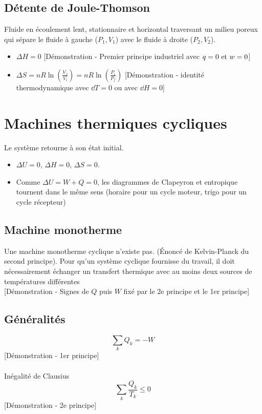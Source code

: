 \documentclass[openany]{book}
\begin{document}
\subsection{Détente de Joule-Thomson}
Fluide en écoulement lent, stationnaire et horizontal traversant un milieu poreux qui sépare le fluide à gauche ($P_1, V_1$) avec le fluide à droite ($P_2, V_2$).

\begin{itemize}
    \item $\Delta H = 0$ [Démonstration - Premier principe industriel avec $q = 0 \text{ et } w = 0$]
    \item $\Delta S = nR \ln(\frac{V_f}{V_i}) = nR \ln(\frac{P_i}{P_f})$ [Démonstration - identité thermodynamique avec $\dd T = 0$ ou avec $\dd H = 0$]
\end{itemize}

\section{Machines thermiques cycliques}
Le système retourne à son état initial. 

\begin{itemize}
    \item $\Delta U = 0$, $\Delta H = 0$, $\Delta S = 0$.
    \item Comme $\Delta U = W + Q = 0$, les diagrammes de Clapeyron et entropique tournent dans le même sens (horaire pour un cycle moteur, trigo pour un cycle récepteur)
\end{itemize}

\subsection{Machine monotherme}
Une machine monotherme cyclique n'existe pas. (Énoncé de Kelvin-Planck du second principe). Pour qu'un système cyclique fournisse du travail, il doit nécessairement échanger un transfert thermique avec au moins deux sources de températures différentes \\

[Démonstration - Signes de $Q$ puis $W$ fixé par le 2e principe et le 1er principe]

\subsection{Généralités}
\[ \sum_k Q_k = -W \]
[Démonstration - 1er principe] \\ \\
Inégalité de Clausius
\[ \sum_k \frac{Q_k}{T_k} \leq 0 \]
[Démonstration - 2e principe] \\ \\
\end{document}
